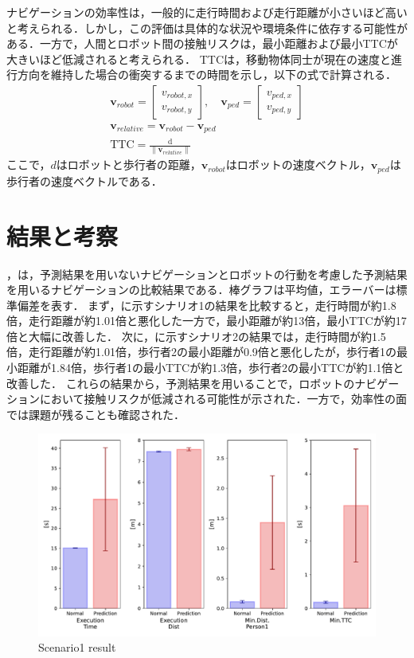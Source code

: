 ナビゲーションの効率性は，一般的に走行時間および走行距離が小さいほど高いと考えられる．しかし，この評価は具体的な状況や環境条件に依存する可能性がある．一方で，人間とロボット間の接触リスクは，最小距離および最小TTCが大きいほど低減されると考えられる．
TTCは，移動物体同士が現在の速度と進行方向を維持した場合の衝突するまでの時間を示し，以下の式で計算される．
\setlength{\jot}{1em}
\begin{align}
  \mathbf{v}_{robot} = \begin{bmatrix} v_{robot,x} \\ v_{robot,y} \end{bmatrix}, \quad 
  \mathbf{v}_{ped} = \begin{bmatrix} v_{ped,x} \\ v_{ped,y} \end{bmatrix} \\
  \mathbf{v}_{relative} = \mathbf{v}_{robot} - \mathbf{v}_{ped} \\
  \text{TTC} = \frac{\text{d}}{\|\mathbf{v}_{relative}\|}
\end{align}
ここで，$d$はロボットと歩行者の距離，$\mathbf{v}_{robot}$はロボットの速度ベクトル，$\mathbf{v}_{ped}$は歩行者の速度ベクトルである．

\section{結果と考察}\label{sec:exp-sim-result}
，は，予測結果を用いないナビゲーションとロボットの行動を考慮した予測結果を用いるナビゲーションの比較結果である．棒グラフは平均値，エラーバーは標準偏差を表す．
まず，に示すシナリオ1の結果を比較すると，走行時間が約1.8倍，走行距離が約1.01倍と悪化した一方で，最小距離が約13倍，最小TTCが約17倍と大幅に改善した．
次に，に示すシナリオ2の結果では，走行時間が約1.5倍，走行距離が約1.01倍，歩行者2の最小距離が0.9倍と悪化したが，歩行者1の最小距離が1.84倍，歩行者1の最小TTCが約1.3倍，歩行者2の最小TTCが約1.1倍と改善した．
これらの結果から，予測結果を用いることで，ロボットのナビゲーションにおいて接触リスクが低減される可能性が示された．一方で，効率性の面では課題が残ることも確認された．

\begin{figure}[H]
  \centering
 \includegraphics[keepaspectratio, scale=0.53]
      {images/scenario1_result.pdf}
  \caption{Scenario1 result}
 \label{Fig:scenario1-result}
\end{figure} 


